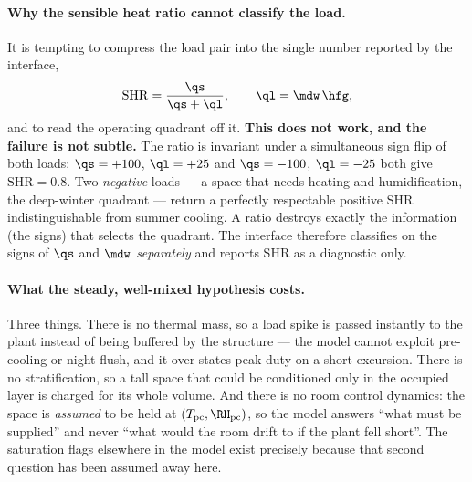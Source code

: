 \begin{center}
\end{center}

\paragraph{Why the sensible heat ratio cannot classify the load.} It is
tempting to compress the load pair into the single number reported by the
interface,
\begin{equation}
\mathrm{SHR}=\frac{\qs}{\qs+\ql},\qquad \ql=\mdw\,\hfg ,
\label{eq:dem:shr}
\end{equation}
and to read the operating quadrant off it. \textbf{This does not work, and the
failure is not subtle.} The ratio is invariant under a simultaneous sign flip of
both loads: $\qs=+100$, $\ql=+25$ and $\qs=-100$, $\ql=-25$ both give
$\mathrm{SHR}=0.8$. Two \emph{negative} loads --- a space that needs heating and
humidification, the deep-winter quadrant --- return a perfectly respectable
positive SHR indistinguishable from summer cooling. A ratio destroys exactly the
information (the signs) that selects the quadrant. The interface therefore
classifies on the signs of $\qs$ and $\mdw$ \emph{separately} and reports
SHR as a diagnostic only.

\paragraph{What the steady, well-mixed hypothesis costs.} Three things. There is
no thermal mass, so a load spike is passed instantly to the plant instead of
being buffered by the structure --- the model cannot exploit pre-cooling or
night flush, and it over-states peak duty on a short excursion. There is no
stratification, so a tall space that could be conditioned only in the occupied
layer is charged for its whole volume. And there is no room control dynamics:
the space is \emph{assumed} to be held at
$(T_{\mathrm{pc}},\RH_{\mathrm{pc}})$, so the model answers ``what must be
supplied'' and never ``what would the room drift to if the plant fell short''.
The saturation flags elsewhere in the model exist precisely because that second
question has been assumed away here.

